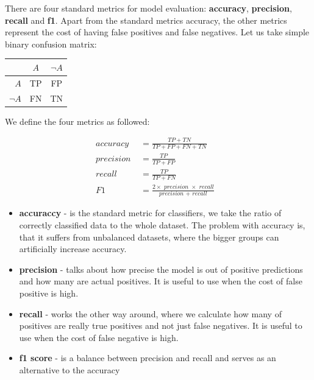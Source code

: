 There are four standard metrics \cite{nn-metrics} for model evaluation: \textbf{accuracy}, \textbf{precision}, \textbf{recall} and \textbf{f1}. Apart from the standard metrics accuracy, the other metrics represent the cost of having false positives and false negatives. Let us take simple binary confusion matrix:

\begin{table}[h]
\centering
\begin{tabular}{|r|c c|}

\hline 
& $A$ & $\neg A$ \\
\hline 
$A$ & TP & FP \\
$\neg A$ & FN & TN\footnotemark\\

\hline

\end{tabular}

\end{table}


\noindent
We define the four metrics as followed:

\begin{align*}
\textit{accuracy } & = \frac{TP + TN}{TP + FP + FN + TN} & \\
\textit{precision } & = \frac{TP}{TP + FP} & \\
\textit{recall } & = \frac{TP}{TP + FN} & \\
\textit{F1 } & = \frac{2 \times \textit{ precision } \times \textit{ recall}}{\textit{precision } + \textit{ recall}} &
\end{align*}

\begin{itemize}

\item \textbf{accuraccy} - is the standard metric for classifiers, we take the ratio of correctly classified data to the whole dataset. The problem with accuracy is, that it suffers from unbalanced datasets, where the bigger groups can artificially increase accuracy.

\item \textbf{precision} - talks about how precise the model is out of positive predictions and how many are actual positives. It is useful to use when the cost of false positive is high.

\item \textbf{recall} - works the other way around, where we calculate how many of positives are really true positives and not just false negatives. It is useful to use when the cost of false negative is high.

\item \textbf{f1 score} - is a balance between precision and recall and serves as an alternative to the accuracy

\end{itemize}




